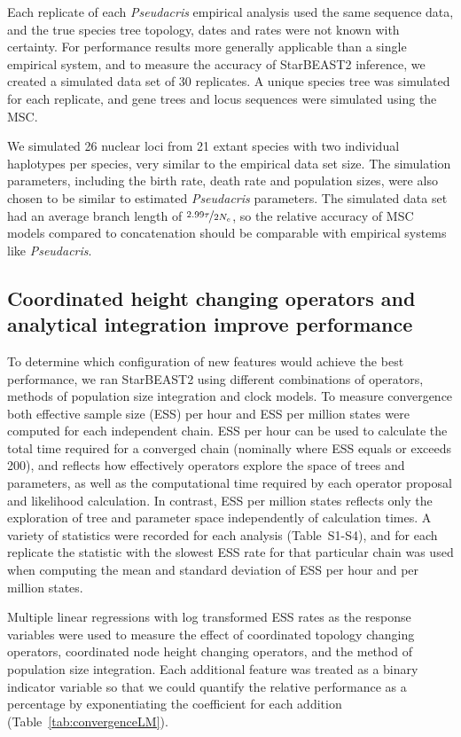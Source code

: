 \documentclass[12pt]{article}
\begin{document}
Each replicate of each \textit{Pseudacris} empirical analysis used the same
sequence data, and the true species tree topology, dates and rates were not
known with certainty. For performance results more generally applicable than a
single empirical system, and to measure the accuracy of StarBEAST2 inference,
we created a simulated data set of 30 replicates. A unique species tree was
simulated for each replicate, and gene trees and locus sequences were
simulated using the MSC.

We simulated 26 nuclear loci from 21 extant species with two individual
haplotypes per species, very similar to the empirical data set size. The
simulation parameters, including the birth rate, death rate and population
sizes, were also chosen to be similar to estimated \textit{Pseudacris}
parameters. The simulated data set had an average branch length of
$\nicefrac{2.99\tau}{2N_e}$, so the relative accuracy of MSC models compared
to concatenation should be comparable with empirical systems like
\textit{Pseudacris}.

\subsection{Coordinated height changing operators and analytical integration improve performance}

To determine which configuration of new features would achieve the best
performance, we ran StarBEAST2 using different combinations of operators,
methods of population size integration and clock models. To measure
convergence both effective sample size (ESS) per hour and ESS per million
states were computed for each independent chain. ESS per hour can be used to
calculate the total time required for a converged chain (nominally where ESS
equals or exceeds 200), and reflects how effectively operators explore the
space of trees and parameters, as well as the computational time required by
each operator proposal and likelihood calculation. In contrast, ESS per
million states reflects only the exploration of tree and parameter space
independently of calculation times. A variety of statistics were recorded for
each analysis (Table~S1-S4), and for each replicate the statistic with the
slowest ESS rate for that particular chain was used when computing the mean
and standard deviation of ESS per hour and per million states.

Multiple linear regressions with log transformed ESS rates as the response
variables were used to measure the effect of coordinated topology changing
operators, coordinated node height changing operators, and the method of
population size integration. Each additional feature was treated as a binary
indicator variable so that we could quantify the relative performance as a
percentage by exponentiating the coefficient for each addition
(Table~\ref{tab:convergenceLM}).
\end{document}
